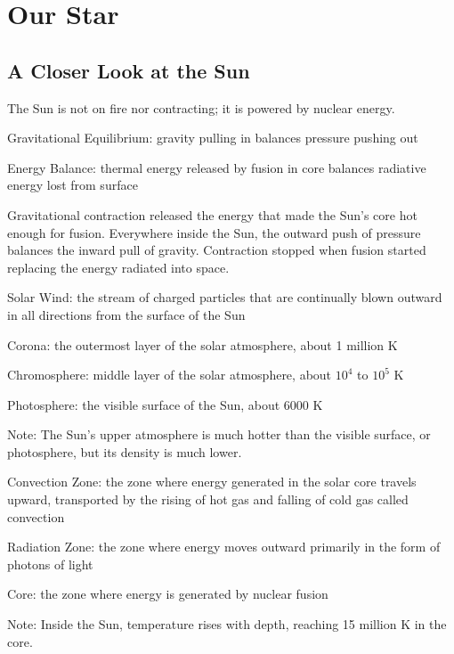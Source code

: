 \documentclass[12pt]{article}
\begin{document}
\section{Our Star}
\subsection{A Closer Look at the Sun}
The Sun is not on fire nor contracting; it is powered by nuclear energy. 
\begin{definition} Gravitational Equilibrium: gravity pulling in balances pressure pushing out \end{definition} 
\begin{definition} Energy Balance: thermal energy released by fusion in core balances radiative energy lost from surface \end{definition} 
Gravitational contraction released the energy that made the Sun's core hot enough for fusion. Everywhere inside the Sun, the outward push of pressure balances the inward pull of gravity. Contraction stopped when fusion started replacing the energy radiated into space. 
\begin{definition} Solar Wind: the stream of charged particles that are continually blown outward in all directions from the surface of the Sun \end{definition} \newpage
\begin{definition} Corona: the outermost layer of the solar atmosphere, about 1 million K \end{definition} 
\begin{definition} Chromosphere: middle layer of the solar atmosphere, about $10^4$ to $10^5$ K \end{definition}
\begin{definition} Photosphere: the visible surface of the Sun, about 6000 K \end{definition} 
Note: The Sun's upper atmosphere is much hotter than the visible surface, or photosphere, but its density is much lower. 
\begin{definition} Convection Zone: the zone where energy generated in the solar core travels upward, transported by the rising of hot gas and falling of cold gas called convection \end{definition} 
\begin{definition} Radiation Zone: the zone where energy moves outward primarily in the form of photons of light \end{definition} 
\begin{definition} Core: the zone where energy is generated by nuclear fusion \end{definition} 
Note: Inside the Sun, temperature rises with depth, reaching 15 million K in the core. 
\end{document}
